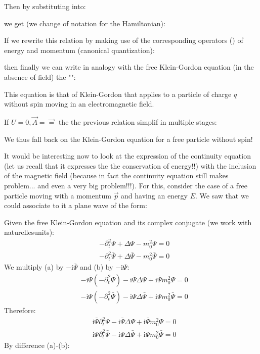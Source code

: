 	Then by substituting into:
	
	we get (we change of notation for the Hamiltonian):
	
	If we rewrite this relation by making use of the corresponding operators () of energy and momentum (canonical quantization):
	
	then finally we can write in analogy with the free Klein-Gordon equation (in the absence of field) the "":
	
	This equation is that of Klein-Gordon that applies to a particle of charge $q$ without  spin moving in an electromagnetic field.

	If $U=0,\vec{A}=\vec{=}$ the the previous relation simplif in multiple stages:
	
	We thus fall back on the Klein-Gordon equation for a free particle without spin!
	
	It would be interesting now to look at the expression of the continuity equation (let us recall that it expresses the the conservation of energy!!) with the inclusion of the magnetic field (because in fact the continuity equation still makes problem... and even a very big problem!!!). For this, consider the case of a free particle moving with a momentum $\vec{p}$ and having an energy $E$. We saw that we could associate to it a plane wave of the form:
	
	Given the free Klein-Gordon equation and its complex conjugate (we work with naturellesunits):
	\begin{subequations}
	\label{equations}
	\begin{align}
	  \label{eq:a}
	  &-\partial_t^2\Psi+\Delta \Psi-m_0^2\Psi=0 \\
	  \label{eq:b}
	  &-\partial_t^2\bar{\Psi}+\Delta \bar{\Psi}-m_0^2\bar{\Psi}=0
	\end{align}
	\end{subequations}
	We multiply (a) by $-\mathrm{i}\bar{\Psi}$ and (b) by $-\mathrm{i}\Psi$:
	\begin{subequations}
	\label{equations}
	\begin{align}
	  \label{eq:a}
	  &-\mathrm{i}\bar{\Psi}\left(-\partial_t^2\Psi\right)-\mathrm{i}\bar{\Psi}\Delta \Psi+\mathrm{i}\bar{\Psi}m_0^2\Psi=0 \\
	  \label{eq:b}
	  &-\mathrm{i}\Psi\left(-\partial_t^2\bar{\Psi}\right)-\mathrm{i}\Psi\Delta \bar{\Psi}+\mathrm{i}\Psi m_0^2\bar{\Psi}=0
	\end{align}
	\end{subequations}
	Therefore:
	\begin{subequations}
	\label{equations}
	\begin{align}
	  \label{eq:a}
	  &\mathrm{i}\bar{\Psi}\partial_t^2\Psi-\mathrm{i}\bar{\Psi}\Delta \Psi+\mathrm{i}\bar{\Psi}m_0^2\Psi=0 \\
	  \label{eq:b}
	  &\mathrm{i}\Psi\partial_t^2\bar{\Psi}-\mathrm{i}\Psi\Delta \bar{\Psi}+\mathrm{i}\Psi m_0^2\bar{\Psi}=0
	\end{align}
	\end{subequations}
	By difference (a)-(b):
	
